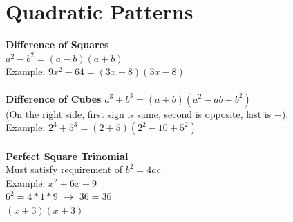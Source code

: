 \documentclass{article}
\begin{document}
	\section*{Quadratic Patterns}
	\textbf{Difference of Squares} \\
	$a^2 - b^2 = (a-b)(a+b)$ \\
	Example: $9x^2 -64 = (3x + 8 )(3x-8)$ \\ \\
	\textbf{Difference of Cubes}\newline
	$a^3 + b^3 = (a+b)(a^2 - ab +b^2)$\\
	(On the right side, first sign is same, second is opposite, last is +). \\
	Example: $2^3 + 5^3 = (2 + 5)(2^2 - 10 + 5^2)$ \\
	\\
	\textbf{Perfect Square Trinomial} \\
	Must satisfy requirement of $b^2=4ac$ \\
	Example: $x^2+6x+9$ \\
	$6^2 = 4*1*9$ $\rightarrow$ $36=36$ \\
	$(x+3)(x+3)$ 
\end{document}
